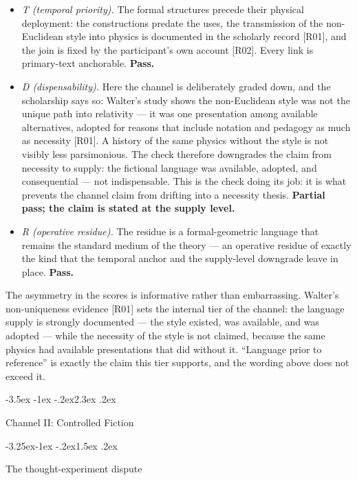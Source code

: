 \documentclass[11pt,a4paper]{article}
\makeatletter
\renewcommand\section{\@startsection{section}{1}{\z@}%
  {-3.5ex \@plus -1ex \@minus -.2ex}{2.3ex \@plus .2ex}%
  {\normalfont\Large\bfseries\raggedright}}
\renewcommand\subsection{\@startsection{subsection}{2}{\z@}%
  {-3.25ex\@plus -1ex \@minus -.2ex}{1.5ex \@plus .2ex}%
  {\normalfont\large\bfseries\raggedright}}
\makeatother
\begin{document}
\begin{itemize}[leftmargin=1.6em,itemsep=2pt,parsep=0pt,topsep=3pt]
\item \textit{T (temporal priority).} The formal structures precede their physical deployment: the constructions predate the uses, the transmission of the non-Euclidean style into physics is documented in the scholarly record [R01], and the join is fixed by the participant's own account [R02]. Every link is primary-text anchorable. \textbf{Pass.}
\item \textit{D (dispensability).} Here the channel is deliberately graded down, and the scholarship says so: Walter's study shows the non-Euclidean style was not the unique path into relativity — it was one presentation among available alternatives, adopted for reasons that include notation and pedagogy as much as necessity [R01]. A history of the same physics without the style is not visibly less parsimonious. The check therefore downgrades the claim from necessity to supply: the fictional language was available, adopted, and consequential — not indispensable. This is the check doing its job: it is what prevents the channel claim from drifting into a necessity thesis. \textbf{Partial pass; the claim is stated at the supply level.}
\item \textit{R (operative residue).} The residue is a formal-geometric language that remains the standard medium of the theory — an operative residue of exactly the kind that the temporal anchor and the supply-level downgrade leave in place. \textbf{Pass.}
\end{itemize}

The asymmetry in the scores is informative rather than embarrassing. Walter's non-uniqueness evidence [R01] sets the internal tier of the channel: the language supply is strongly documented — the style existed, was available, and was adopted — while the necessity of the style is not claimed, because the same physics had available presentations that did without it. ``Language prior to reference'' is exactly the claim this tier supports, and the wording above does not exceed it.

\section{Channel II: Controlled Fiction}

\subsection{The thought-experiment dispute}
\end{document}
